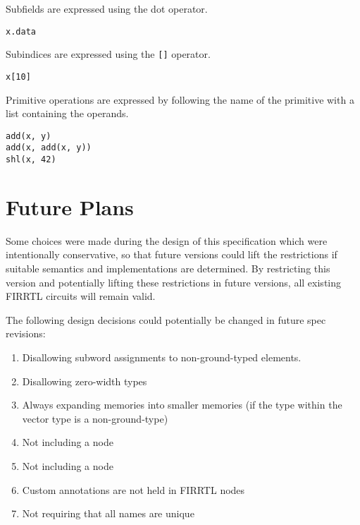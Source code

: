 \documentclass[12pt]{article}
\begin{document}
Subfields are expressed using the dot operator.
\begin{verbatim}
x.data
\end{verbatim}

Subindices are expressed using the \verb|[]| operator.
\begin{verbatim}
x[10]
\end{verbatim}

Primitive operations are expressed by following the name of the primitive with a list containing the operands. 
\begin{verbatim}
add(x, y)
add(x, add(x, y))
shl(x, 42)
\end{verbatim}

\section{Future Plans}
Some choices were made during the design of this specification which were intentionally conservative, so that future versions could lift the restrictions if suitable semantics and implementations are determined.
By restricting this version and potentially lifting these restrictions in future versions, all existing FIRRTL circuits will remain valid.

The following design decisions could potentially be changed in future spec revisions:
\begin{enumerate}[topsep=3pt,itemsep=-0.5ex,partopsep=1ex,parsep=1ex]
\item Disallowing subword assignments to non-ground-typed elements.
\item Disallowing zero-width types
\item Always expanding memories into smaller memories (if the type within the vector type is a non-ground-type)
\item Not including a  node
\item Not including a  node
\item Custom annotations are not held in FIRRTL nodes
\item Not requiring that all names are unique
\end{enumerate}
\end{document}
